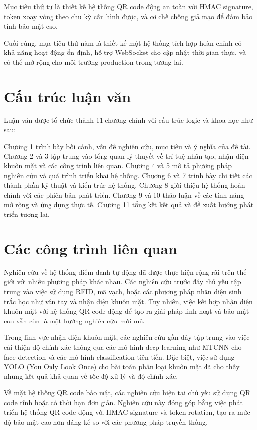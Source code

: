 \documentclass[12pt,a4paper]{report}
\begin{document}
Mục tiêu thứ tư là thiết kế hệ thống QR code động an toàn với HMAC signature, token xoay vòng theo chu kỳ cấu hình được, và cơ chế chống giả mạo để đảm bảo tính bảo mật cao.

Cuối cùng, mục tiêu thứ năm là thiết kế một hệ thống tích hợp hoàn chỉnh có khả năng hoạt động ổn định, hỗ trợ WebSocket cho cập nhật thời gian thực, và có thể mở rộng cho môi trường production trong tương lai.

\section{Cấu trúc luận văn}
Luận văn được tổ chức thành 11 chương chính với cấu trúc logic và khoa học như sau:

Chương 1 trình bày bối cảnh, vấn đề nghiên cứu, mục tiêu và ý nghĩa của đề tài. Chương 2 và 3 tập trung vào tổng quan lý thuyết về trí tuệ nhân tạo, nhận diện khuôn mặt và các công trình liên quan. Chương 4 và 5 mô tả phương pháp nghiên cứu và quá trình triển khai hệ thống. Chương 6 và 7 trình bày chi tiết các thành phần kỹ thuật và kiến trúc hệ thống. Chương 8 giới thiệu hệ thống hoàn chỉnh với các phiên bản phát triển. Chương 9 và 10 thảo luận về các tính năng mở rộng và ứng dụng thực tế. Chương 11 tổng kết kết quả và đề xuất hướng phát triển tương lai.

\section{Các công trình liên quan}
Nghiên cứu về hệ thống điểm danh tự động đã được thực hiện rộng rãi trên thế giới với nhiều phương pháp khác nhau. Các nghiên cứu trước đây chủ yếu tập trung vào việc sử dụng RFID, mã vạch, hoặc các phương pháp nhận diện sinh trắc học như vân tay và nhận diện khuôn mặt. Tuy nhiên, việc kết hợp nhận diện khuôn mặt với hệ thống QR code động để tạo ra giải pháp linh hoạt và bảo mật cao vẫn còn là một hướng nghiên cứu mới mẻ.

Trong lĩnh vực nhận diện khuôn mặt, các nghiên cứu gần đây tập trung vào việc cải thiện độ chính xác thông qua các mô hình deep learning như MTCNN cho face detection và các mô hình classification tiên tiến. Đặc biệt, việc sử dụng YOLO (You Only Look Once) cho bài toán phân loại khuôn mặt đã cho thấy những kết quả khả quan về tốc độ xử lý và độ chính xác.

Về mặt hệ thống QR code bảo mật, các nghiên cứu hiện tại chủ yếu sử dụng QR code tĩnh hoặc có thời hạn đơn giản. Nghiên cứu này đóng góp bằng việc phát triển hệ thống QR code động với HMAC signature và token rotation, tạo ra mức độ bảo mật cao hơn đáng kể so với các phương pháp truyền thống.
\end{document}

